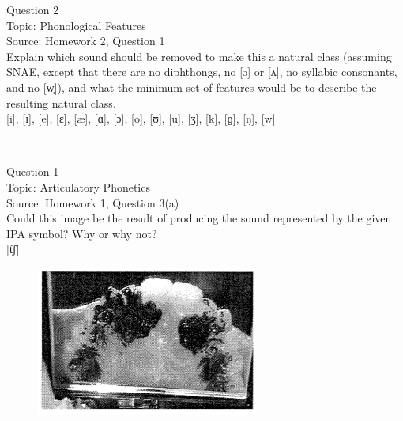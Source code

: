 \documentclass[12pt]{article}
\begin{document}
\newpage

{\large Question 2}\\

Topic: Phonological Features\\
Source: Homework 2, Question 1\\

Explain which sound should be removed to make this a natural class (assuming SNAE, except that there are no diphthongs, no [ə] or [ʌ], no syllabic consonants, and no [w̥]), and what the minimum set of features would be to describe the resulting natural class.\\

{[i]}, {[ɪ]}, {[e]}, {[ɛ]}, {[æ]}, {[ɑ]}, {[ɔ]}, {[o]}, {[ʊ]}, {[u]}, {[ʒ]}, {[k]}, {[ɡ]}, {[ŋ]}, {[w]}


\newpage

\begin{center}
\textbf{{\color{red}{\HUGE END OF EXAM}}}\\

\end{center}
\newpage

\begin{center}
\textbf{{\color{blue}{\HUGE START OF EXAM\\}}}

\textbf{{\color{blue}{\HUGE Student ID: 51191\\}}}

\textbf{{\color{blue}{\HUGE 4:20\\}}}

\end{center}
\newpage

{\large Question 1}\\

Topic: Articulatory Phonetics\\
Source: Homework 1, Question 3(a)\\

Could this image be the result of producing the sound represented by the given IPA symbol? Why or why not?\\

{[t͡ʃ]}

\begin{figure}[H]
\includegraphics{../images/staticpalatography_fricative.png}
\end{figure}
\end{document}

